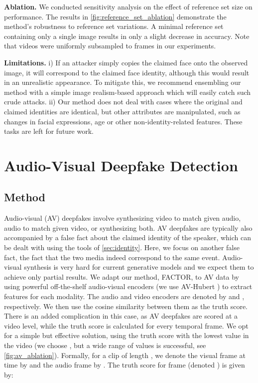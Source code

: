 \documentclass{article} \usepackage{iclr2024_conference,times}
\begin{document}
\textbf{Ablation.} We conducted sensitivity analysis on the effect of reference set size on performance. The results in \cref{fig:reference_set_ablation} demonstrate the method's robustness to reference set variations. A minimal reference set containing only a single image results in only a slight decrease in accuracy. Note that videos were uniformly subsampled to  frames in our experiments.

\textbf{Limitations.} i) If an attacker simply copies the claimed face onto the observed image, it will correspond to the claimed face identity, although this would result in an unrealistic appearance. To mitigate this, we recommend ensembling our method with a simple image realism-based approach which will easily catch such crude attacks. ii) Our method does not deal with cases where the original and claimed identities are identical, but other attributes are manipulated, such as changes in facial expressions, age or other non-identity-related features. These tasks are left for future work.

\section{Audio-Visual Deepfake Detection}
\label{sec:audio-visual}

\subsection{Method}
Audio-visual (AV) deepfakes involve synthesizing video to match given audio, audio to match given video, or synthesizing both. AV deepfakes are typically also accompanied by a false fact about the claimed identity of the speaker, which can be dealt with using the tools of \cref{sec:identity}. Here, we focus on another false fact, the fact that the two media indeed correspond to the same event. Audio-visual synthesis is very hard for current generative models and we expect them to achieve only partial results. We adapt our method, FACTOR, to AV data by using powerful off-the-shelf audio-visual encoders (we use AV-Hubert \citep{avhubert}) to extract features for each modality. The audio and video encoders are denoted by  and , respectively. We then use the cosine similarity between them as the truth score. There is an added complication in this case, as AV deepfakes are scored at a video level, while the truth score is calculated for every temporal frame. We opt for a simple but effective solution, using the truth score with the  lowest value in the video (we choose , but a wide range of values is successful, see \cref{fig:av_ablation}). Formally, for a clip of length , we denote the visual frame at time  by  and the audio frame by . The truth score for frame  (denoted ) is given by:
\end{document}
